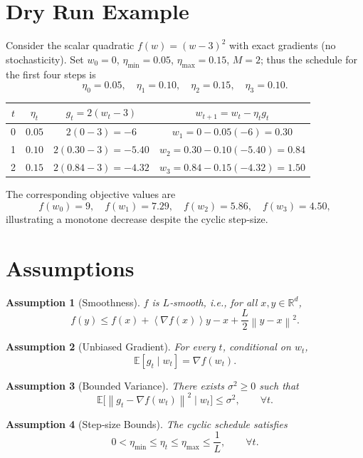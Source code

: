 \documentclass{article}
\newcommand{\E}{\mathbb{E}}
\newcommand{\R}{\mathbb{R}}
\newcommand{\norm}[1]{\left\| #1 \right\|}
\newcommand{\inner}[1]{\left\langle #1 \right\rangle}
\newtheorem{assumption}{Assumption}
\begin{document}
\section*{Dry Run Example}
Consider the scalar quadratic $f(w)=(w-3)^2$ with exact gradients (no stochasticity).  
Set $w_0=0$, $\eta_{\min}=0.05$, $\eta_{\max}=0.15$, $M=2$; thus the schedule for the first four steps is
\[
\eta_0=0.05,\quad \eta_1=0.10,\quad \eta_2=0.15,\quad \eta_3=0.10.
\]

\begin{center}
\begin{tabular}{c|c|c|c}
$t$ & $\eta_t$ & $g_t=2(w_t-3)$ & $w_{t+1}=w_t-\eta_t g_t$\\\hline
0 & $0.05$ & $2(0-3)=-6$ & $w_1=0-0.05(-6)=0.30$\\
1 & $0.10$ & $2(0.30-3)=-5.40$ & $w_2=0.30-0.10(-5.40)=0.84$\\
2 & $0.15$ & $2(0.84-3)=-4.32$ & $w_3=0.84-0.15(-4.32)=1.50$
\end{tabular}
\end{center}
The corresponding objective values are
\[
f(w_0)=9,\quad f(w_1)=7.29,\quad f(w_2)=5.86,\quad f(w_3)=4.50,
\]
illustrating a monotone decrease despite the cyclic step‑size.

\newpage

\section*{Assumptions}
\begin{assumption}[Smoothness]\label{ass:smooth}
$f$ is $L$‑smooth, i.e., for all $x,y\in\R^{d}$,
\[
f(y)\le f(x)+\inner{\nabla f(x)}{y-x}+\frac{L}{2}\norm{y-x}^2 .
\]
\end{assumption}
\begin{assumption}[Unbiased Gradient]\label{ass:unbiased}
For every $t$, conditional on $w_t$,
\[
\E[g_t\mid w_t]=\nabla f(w_t).
\]
\end{assumption}
\begin{assumption}[Bounded Variance]\label{ass:variance}
There exists $\sigma^2\ge0$ such that
\[
\E\big[\norm{g_t-\nabla f(w_t)}^2\mid w_t\big]\le\sigma^2,\qquad\forall t .
\]
\end{assumption}
\begin{assumption}[Step‑size Bounds]\label{ass:stepsize}
The cyclic schedule satisfies
\[
0<\eta_{\min}\le\eta_t\le\eta_{\max}\le\frac{1}{L},\qquad\forall t .
\]
\end{assumption}
\end{document}
